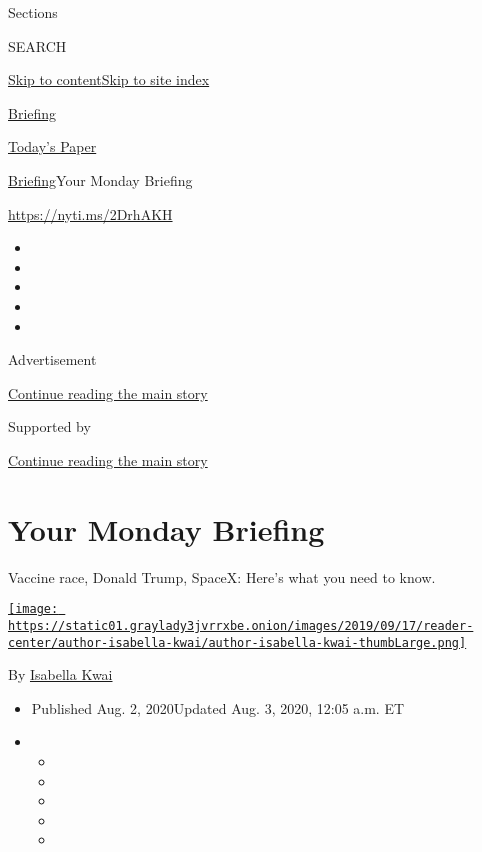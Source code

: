 Sections

SEARCH

\protect\hyperlink{site-content}{Skip to
content}\protect\hyperlink{site-index}{Skip to site index}

\href{https://www.nytimes3xbfgragh.onion/interactive/2018/briefing/global-morning-briefing-newsletter-signup.html}{Briefing}

\href{https://myaccount.nytimes3xbfgragh.onion/auth/login?response_type=cookie\&client_id=vi}{}

\href{https://www.nytimes3xbfgragh.onion/section/todayspaper}{Today's
Paper}

\href{/interactive/2018/briefing/global-morning-briefing-newsletter-signup.html}{Briefing}\textbar{}Your
Monday Briefing

\url{https://nyti.ms/2DrhAKH}

\begin{itemize}
\item
\item
\item
\item
\item
\end{itemize}

Advertisement

\protect\hyperlink{after-top}{Continue reading the main story}

Supported by

\protect\hyperlink{after-sponsor}{Continue reading the main story}

\hypertarget{your-monday-briefing}{%
\section{Your Monday Briefing}\label{your-monday-briefing}}

Vaccine race, Donald Trump, SpaceX: Here's what you need to know.

\href{https://www.nytimes3xbfgragh.onion/by/isabella-kwai}{\texttt{[image: https://static01.graylady3jvrrxbe.onion/images/2019/09/17/reader-center/author-isabella-kwai/author-isabella-kwai-thumbLarge.png]}}

By \href{https://www.nytimes3xbfgragh.onion/by/isabella-kwai}{Isabella
Kwai}

\begin{itemize}
\item
  Published Aug. 2, 2020Updated Aug. 3, 2020, 12:05 a.m. ET
\item
  \begin{itemize}
  \item
  \item
  \item
  \item
  \item
  \end{itemize}
\end{itemize}

